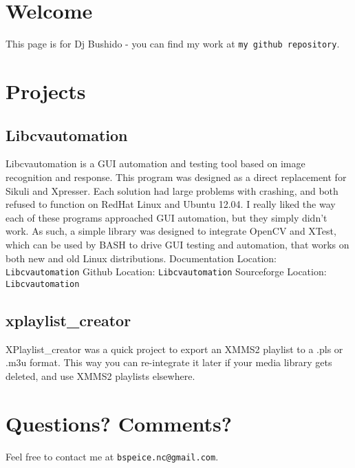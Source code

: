 \section{Welcome}\label{index_welcome}
This page is for Dj Bushido - you can find my work at {\tt my github repository}. \section{Projects}\label{index_projects}
\subsection{Libcvautomation}\label{index_libcvautomation}
Libcvautomation is a GUI automation and testing tool based on image recognition and response. This program was designed as a direct replacement for Sikuli and Xpresser. Each solution had large problems with crashing, and both refused to function on Red\-Hat Linux and Ubuntu 12.04. I really liked the way each of these programs approached GUI automation, but they simply didn't work. As such, a simple library was designed to integrate Open\-CV and XTest, which can be used by BASH to drive GUI testing and automation, that works on both new and old Linux distributions. Documentation Location: {\tt Libcvautomation} Github Location: {\tt Libcvautomation} Sourceforge Location: {\tt Libcvautomation}\subsection{xplaylist\_\-creator}\label{index_xplaylistcreator}
XPlaylist\_\-creator was a quick project to export an XMMS2 playlist to a .pls or .m3u format. This way you can re-integrate it later if your media library gets deleted, and use XMMS2 playlists elsewhere.\section{Questions? Comments?}\label{index_questions}
Feel free to contact me at {\tt bspeice.nc@gmail.com}. 